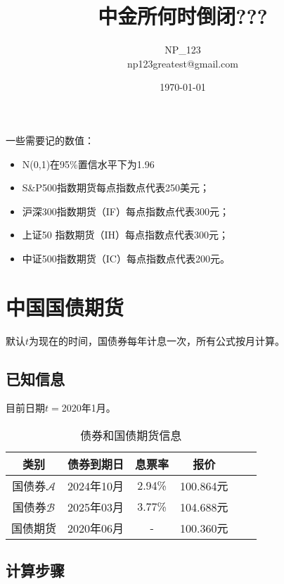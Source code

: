 \documentclass{article}
\title{\huge 中金所何时倒闭???}
\author{NP\_123\\np123greatest@gmail.com}
\date{\today}
\begin{document}
 
\maketitle
\tableofcontents

    一些需要记的数值：
\begin{itemize}
    \item N(0,1)在95\%置信水平下为1.96
    \item S\&P500指数期货每点指数点代表250美元；
    \item 沪深300指数期货（IF）每点指数点代表300元；
    \item 上证50 指数期货（IH）每点指数点代表300元；
    \item 中证500指数期货（IC）每点指数点代表200元。
\end{itemize}

\newpage
\section{中国国债期货}

默认$t$为现在的时间，国债券每年计息一次，所有公式按月计算。

\subsection{已知信息}
目前日期$t=$2020年1月。
\begin{table}[htbp]
    \centering
    \caption{债券和国债期货信息}
    \label{tab:my-table}
    \begin{tabular}{@{}cccccc@{}}
        \toprule
        类别&债券到期日       & 息票率 & 报价   \\ \midrule
        国债券$\mathcal{A} $&2024年10月 & 2.94\%  & 100.864元 \\
        国债券$\mathcal{B} $&2025年03月 & 3.77\%  & 104.688元  \\
        国债期货&2020年06月 & - & 100.360元 \\ \bottomrule
    \end{tabular}
\end{table}

\subsection{计算步骤}
\end{document}
